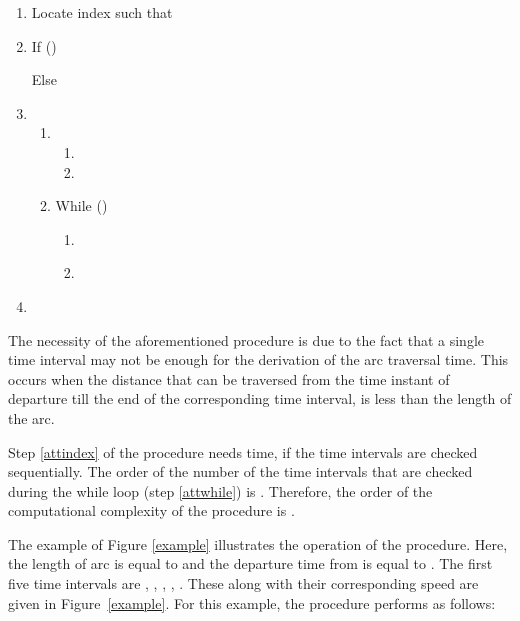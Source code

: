 \documentclass[conference]{IEEEtran}
\begin{document}
\begin{enumerate}
    \item Locate index  such that  \label{attindex}
    \item If () 

    Else 
    \item
    \begin{enumerate}
        \item 
        \begin{enumerate}
            \item 
            \item 
        \end{enumerate}
        \item While ()   \label{attwhile}
        \begin{enumerate}
            \item 
            \item   \label{stepk}
        \end{enumerate}
    \end{enumerate}
    \item   
\end{enumerate}

The necessity of the aforementioned procedure is due to the fact that a single time interval may not  be enough for the derivation of the arc traversal time. This occurs when the distance that can be traversed from the time instant of departure till the end of the corresponding time interval, is less than the length of the arc.



Step \ref{attindex} of the  procedure needs  time, if the time intervals are checked sequentially. The order of the number of the time intervals that are checked during the while loop (step \ref{attwhile}) is . Therefore, the order of the computational complexity of the  procedure is . 

The example of Figure \ref{example} illustrates the operation of the  procedure. Here, the length  of arc  is equal to  and the departure time  from  is equal to . The first five time intervals are ,  ,  ,  , . These along with their corresponding speed are given in Figure~\ref{example}. For this example, the  procedure performs as follows:
\end{document}
